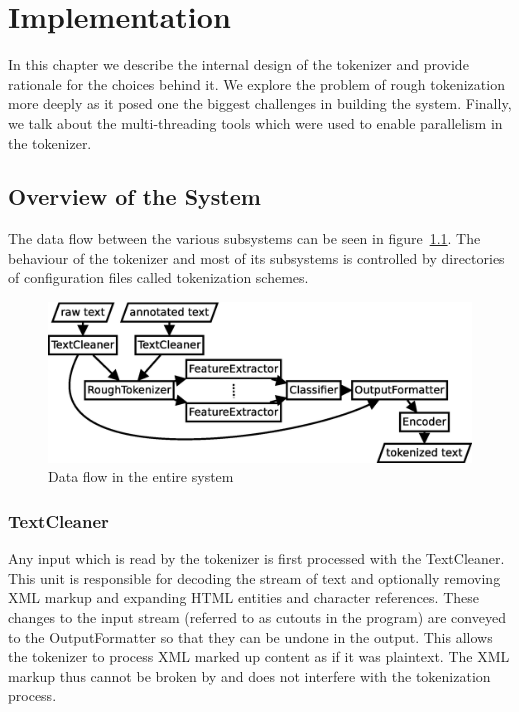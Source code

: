 \chapter{Implementation}
\label{chap:impl}

In this chapter we describe the internal design of the tokenizer and provide
rationale for the choices behind it. We explore the problem of rough
tokenization more deeply as it posed one the biggest challenges in building the
system. Finally, we talk about the multi-threading tools which were used to
enable parallelism in the tokenizer.


\section{Overview of the System}
\label{sec:impl-overview}

The data flow between the various subsystems can be seen in
figure~\ref{fig:all-parts}. The behaviour of the tokenizer and most of its
subsystems is controlled by directories of configuration files called
tokenization schemes.

\begin{figure}
  \includegraphics[width=\textwidth]{img/all-parts.eps}
  \caption{Data flow in the entire system}
  \label{fig:all-parts}
\end{figure}

\subsection{TextCleaner}

Any input which is read by the tokenizer is first processed with the
TextCleaner. This unit is responsible for decoding the stream of text and
optionally removing XML markup and expanding HTML entities and character
references. These changes to the input stream (referred to as cutouts in the
program) are conveyed to the OutputFormatter so that they can be undone in the
output. This allows the tokenizer to process XML marked up content as if it was
plaintext. The XML markup thus cannot be broken by and does not interfere with
the tokenization process.

